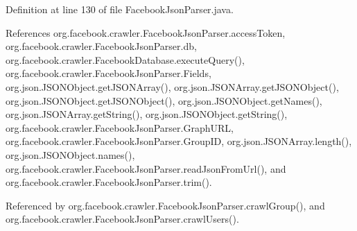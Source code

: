 Definition at line 130 of file Facebook\-Json\-Parser.\-java.



References org.\-facebook.\-crawler.\-Facebook\-Json\-Parser.\-access\-Token, org.\-facebook.\-crawler.\-Facebook\-Json\-Parser.\-db, org.\-facebook.\-crawler.\-Facebook\-Database.\-execute\-Query(), org.\-facebook.\-crawler.\-Facebook\-Json\-Parser.\-Fields, org.\-json.\-J\-S\-O\-N\-Object.\-get\-J\-S\-O\-N\-Array(), org.\-json.\-J\-S\-O\-N\-Array.\-get\-J\-S\-O\-N\-Object(), org.\-json.\-J\-S\-O\-N\-Object.\-get\-J\-S\-O\-N\-Object(), org.\-json.\-J\-S\-O\-N\-Object.\-get\-Names(), org.\-json.\-J\-S\-O\-N\-Array.\-get\-String(), org.\-json.\-J\-S\-O\-N\-Object.\-get\-String(), org.\-facebook.\-crawler.\-Facebook\-Json\-Parser.\-Graph\-U\-R\-L, org.\-facebook.\-crawler.\-Facebook\-Json\-Parser.\-Group\-I\-D, org.\-json.\-J\-S\-O\-N\-Array.\-length(), org.\-json.\-J\-S\-O\-N\-Object.\-names(), org.\-facebook.\-crawler.\-Facebook\-Json\-Parser.\-read\-Json\-From\-Url(), and org.\-facebook.\-crawler.\-Facebook\-Json\-Parser.\-trim().



Referenced by org.\-facebook.\-crawler.\-Facebook\-Json\-Parser.\-crawl\-Group(), and org.\-facebook.\-crawler.\-Facebook\-Json\-Parser.\-crawl\-Users().


